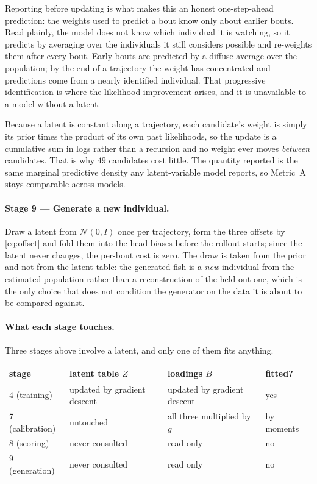 Reporting before updating is what makes this an honest one-step-ahead
prediction: the weights used to predict a bout know only about earlier bouts.
Read plainly, the model does not know which individual it is watching, so it
predicts by averaging over the individuals it still considers possible and
re-weights them after every bout. Early bouts are predicted by a diffuse average
over the population; by the end of a trajectory the weight has concentrated and
predictions come from a nearly identified individual. That progressive
identification is where the likelihood improvement arises, and it is unavailable
to a model without a latent.

Because a latent is constant along a trajectory, each candidate's weight is
simply its prior times the product of its own past likelihoods, so the update is
a cumulative sum in logs rather than a recursion and no weight ever moves
\emph{between} candidates. That is why $49$ candidates cost little. The quantity
reported is the same marginal predictive density any latent-variable model
reports, so Metric~A stays comparable across models.

\paragraph{Stage 9 --- Generate a new individual.}
Draw a latent from $\mathcal{N}(0,I)$ once per trajectory, form the three
offsets by \eqref{eq:offset} and fold them into the head biases before the
rollout starts; since the latent never changes, the per-bout cost is zero. The
draw is taken from the prior and not from the latent table: the generated fish
is a \emph{new} individual from the estimated population rather than a
reconstruction of the held-out one, which is the only choice that does not
condition the generator on the data it is about to be compared against.

\paragraph{What each stage touches.}
Three stages above involve a latent, and only one of them fits anything.

\begin{center}
\begin{tabular}{llll}
\toprule
stage & latent table $Z$ & loadings $B$ & fitted? \\
\midrule
4 (training)   & updated by gradient descent & updated by gradient descent & yes \\
7 (calibration)& untouched                   & all three multiplied by $g$ & by moments \\
8 (scoring)    & never consulted             & read only                   & no \\
9 (generation) & never consulted             & read only                   & no \\
\bottomrule
\end{tabular}
\end{center}

